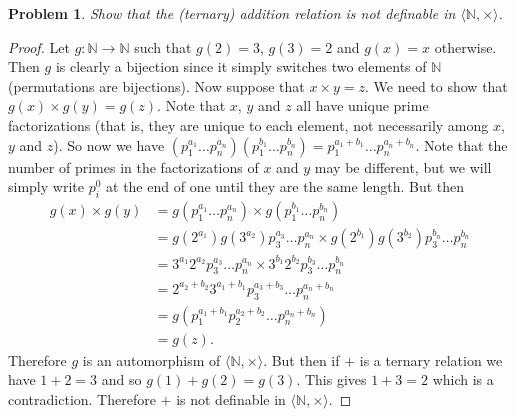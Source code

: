 \documentclass{article}
\newtheorem{problem}{Problem}
\begin{document}
\begin{problem}
Show that the (ternary) addition relation is not definable in $\langle \mathbb{N}, \times \rangle$.
\end{problem}
\begin{proof}
Let $g : \mathbb{N} \to \mathbb{N}$ such that $g(2) = 3$, $g(3) = 2$ and $g(x) = x$ otherwise. Then $g$ is clearly a bijection since it simply switches two elements of $\mathbb{N}$ (permutations are bijections). Now suppose that $x \times y = z$. We need to show that $g(x) \times g(y) = g(z)$. Note that $x$, $y$ and $z$ all have unique prime factorizations (that is, they are unique to each element, not necessarily among $x$, $y$ and $z$). So now we have $(p_1^{a_1} \dots p_n^{a_n})(p_1^{b_1} \dots p_n^{b_n}) = p_1^{a_1 + b_1} \dots p_n^{a_n+b_n}$. Note that the number of primes in the factorizations of $x$ and $y$ may be different, but we will simply write $p_i^0$ at the end of one until they are the same length. But then
\begin{align*}
g(x) \times g(y)
&= g(p_1^{a_1} \dots p_n^{a_n}) \times g(p_1^{b_1} \dots p_n^{b_n})\\
&= g(2^{a_1})g(3^{a_2})p_3^{a_3} \dots p_n^{a_n} \times g(2^{b_1})g(3^{b_2})p_3^{b_n} \dots p_n^{b_n}\\
&= 3^{a_1}2^{a_2}p_3^{a_3} \dots p_n^{a_n} \times 3^{b_1}2^{b_2}p_3^{b_3} \dots p_n^{b_n}\\
&= 2^{a_2+b_2}3^{a_1+b_1}p_3^{a_3 + b_3} \dots p_n^{a_n + b_n}\\
&= g(p_1^{a_1+b_1}p_2^{a_2 + b_2} \dots p_n^{a_n+b_n})\\
&= g(z).
\end{align*}
Therefore $g$ is an automorphism of $\langle \mathbb{N}, \times \rangle$. But then if $+$ is a ternary relation we have $1 + 2 = 3$ and so $g(1) + g(2) = g(3)$. This gives $1 + 3 = 2$ which is a contradiction. Therefore $+$ is not definable in $\langle \mathbb{N}, \times \rangle$.
\end{proof}
\end{document}
